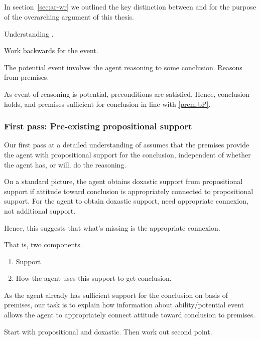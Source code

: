 \subsection{\WR{}}
\label{sec:wr}

\begin{note}[Overview]
  In section~\ref{sec:ar-wr} we outlined the key distinction between \AR{} and \WR{} for the purpose of the overarching argument of this thesis.

  Understanding \WR{}.
\end{note}

\begin{note}
  Work backwards for the event.

  The potential event involves the agent reasoning to some conclusion.
  Reasons from premises.

  As event of reasoning is potential, preconditions are satisfied.
  Hence, conclusion holds, and premises sufficient for conclusion in line with \ref{prem:bP}.
\end{note}

\subsubsection{First pass: Pre-existing propositional support}
\label{sec:first-pass:-prop}

\begin{note}[Outline]
  Our first pass at a detailed understanding of \WR{} assumes that the premises provide the agent with propositional support for the conclusion, independent of whether the agent has, or will, do the reasoning.

  On a standard picture, the agent obtains doxastic support from propositional support if attitude toward conclusion is appropriately connected to propositional support.
  For the agent to obtain doxastic support, need appropriate connexion, not additional support.

  Hence, this suggests that what's missing is the appropriate connexion.

  That is, two components.
  \begin{enumerate}
  \item Support
  \item How the agent uses this support to get conclusion.
  \end{enumerate}

  As the agent already has sufficient support for the conclusion on basis of premises, our task is to explain how information about ability/potential event allows the agent to appropriately connect attitude toward conclusion to premises.

  Start with propositional and doxastic.
  Then work out second point.
\end{note}

